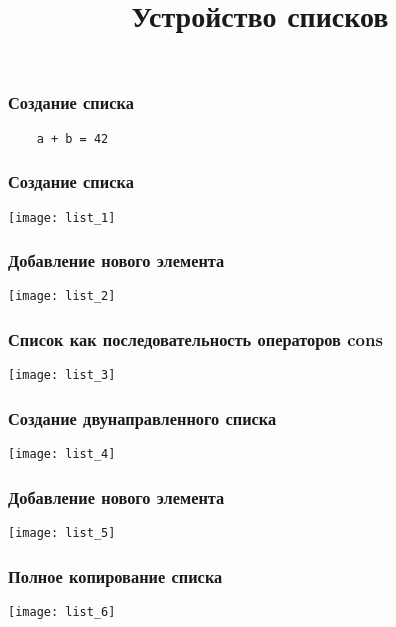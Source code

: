 \documentclass[10pt]{beamer}
\title{Устройство списков}
\begin{document}
\begin{frame}[fragile]
  \frametitle{Создание списка}
  \begin{lstlisting}
    a + b = 42
  \end{lstlisting}
\end{frame}

\begin{frame}
  \frametitle{Создание списка}
  \centering
  \texttt{[image: list\_1]}
\end{frame}

\begin{frame}
  \frametitle{Добавление нового элемента}
  \centering
  \texttt{[image: list\_2]}
\end{frame}

\begin{frame}
  \frametitle{Список как последовательность операторов cons}
  \centering
  \texttt{[image: list\_3]}
\end{frame}

\begin{frame}
  \frametitle{Создание двунаправленного списка}
  \centering
  \texttt{[image: list\_4]}
\end{frame}

\begin{frame}
  \frametitle{Добавление нового элемента}
  \centering
  \texttt{[image: list\_5]}
\end{frame}

\begin{frame}
  \frametitle{Полное копирование списка}
  \centering
  \texttt{[image: list\_6]}
\end{frame}
\end{document}
